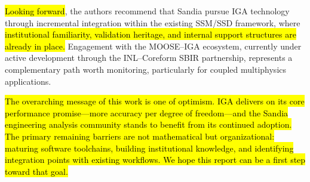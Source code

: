 \documentclass[12pt,report,justified]{SANDreport}
\begin{document}
\hl{Looking forward}, the authors recommend that Sandia pursue IGA technology through
incremental integration within the existing SSM/SSD framework, where \hl{institutional
familiarity, validation heritage, and internal support structures are already in place.}
Engagement with the MOOSE--IGA ecosystem, currently under active development through
the INL--Coreform SBIR partnership, represents a complementary path worth monitoring,
particularly for coupled multiphysics applications.

\hl{The overarching message of this work is one of optimism.  IGA delivers on its
core performance promise---more accuracy per degree of freedom---and the Sandia
engineering analysis community stands to benefit from its continued adoption.}
\hl{The primary remaining barriers are not mathematical but organizational: maturing software
toolchains, building institutional knowledge, and identifying integration points with
existing workflows.  We hope this report can be a first step toward that goal.}



\end{document}
